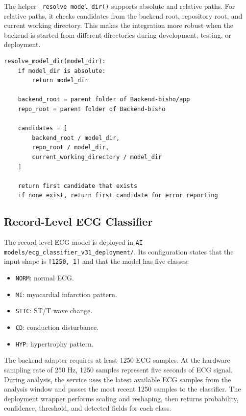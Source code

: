 The helper \texttt{\_resolve\_model\_dir()} supports absolute and relative paths. For relative paths, it checks candidates from the backend root, repository root, and current working directory. This makes the integration more robust when the backend is started from different directories during development, testing, or deployment.

\begin{lstlisting}[caption={Pseudocode for resolving a model directory}]
resolve_model_dir(model_dir):
    if model_dir is absolute:
        return model_dir

    backend_root = parent folder of Backend-bisho/app
    repo_root = parent folder of Backend-bisho

    candidates = [
        backend_root / model_dir,
        repo_root / model_dir,
        current_working_directory / model_dir
    ]

    return first candidate that exists
    if none exist, return first candidate for error reporting
\end{lstlisting}

\subsection{Record-Level ECG Classifier}

The record-level ECG model is deployed in \texttt{AI models/ecg\_classifier\_v31\_deployment/}. Its configuration states that the input shape is \texttt{[1250, 1]} and that the model has five classes:

\begin{itemize}
    \item \texttt{NORM}: normal ECG.
    \item \texttt{MI}: myocardial infarction pattern.
    \item \texttt{STTC}: ST/T wave change.
    \item \texttt{CD}: conduction disturbance.
    \item \texttt{HYP}: hypertrophy pattern.
\end{itemize}

The backend adapter requires at least 1250 ECG samples. At the hardware sampling rate of 250 Hz, 1250 samples represent five seconds of ECG signal. During analysis, the service uses the latest available ECG samples from the analysis window and passes the most recent 1250 samples to the classifier. The deployment wrapper performs scaling and reshaping, then returns probability, confidence, threshold, and detected fields for each class.

